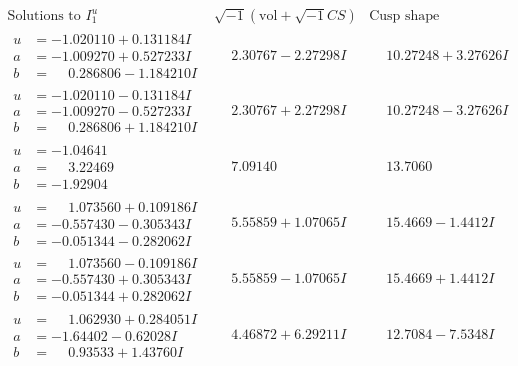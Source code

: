 \documentclass[1p]{elsarticle_modified}
\theoremstyle{definition}
\newcommand{\I}{\sqrt{-1}}
\begin{document}
$$\begin{array}{c|c|c}  
\text{Solutions to }I^u_{1}& \I (\text{vol} + \sqrt{-1}CS) & \text{Cusp shape}\\
 \hline 
\begin{aligned}
u &= -1.020110 + 0.131184 I \\
a &= -1.009270 + 0.527233 I \\
b &= \phantom{-}0.286806 - 1.184210 I\end{aligned}
 & \phantom{-}2.30767 - 2.27298 I & \phantom{-}10.27248 + 3.27626 I \\ \hline\begin{aligned}
u &= -1.020110 - 0.131184 I \\
a &= -1.009270 - 0.527233 I \\
b &= \phantom{-}0.286806 + 1.184210 I\end{aligned}
 & \phantom{-}2.30767 + 2.27298 I & \phantom{-}10.27248 - 3.27626 I \\ \hline\begin{aligned}
u &= -1.04641\phantom{ +0.000000I} \\
a &= \phantom{-}3.22469\phantom{ +0.000000I} \\
b &= -1.92904\phantom{ +0.000000I}\end{aligned}
 & \phantom{-}7.09140\phantom{ +0.000000I} & \phantom{-}13.7060\phantom{ +0.000000I} \\ \hline\begin{aligned}
u &= \phantom{-}1.073560 + 0.109186 I \\
a &= -0.557430 - 0.305343 I \\
b &= -0.051344 - 0.282062 I\end{aligned}
 & \phantom{-}5.55859 + 1.07065 I & \phantom{-}15.4669 - 1.4412 I \\ \hline\begin{aligned}
u &= \phantom{-}1.073560 - 0.109186 I \\
a &= -0.557430 + 0.305343 I \\
b &= -0.051344 + 0.282062 I\end{aligned}
 & \phantom{-}5.55859 - 1.07065 I & \phantom{-}15.4669 + 1.4412 I \\ \hline\begin{aligned}
u &= \phantom{-}1.062930 + 0.284051 I \\
a &= -1.64402 - 0.62028 I \\
b &= \phantom{-}0.93533 + 1.43760 I\end{aligned}
 & \phantom{-}4.46872 + 6.29211 I & \phantom{-}12.7084 - 7.5348 I \\ \hline\begin{aligned}

\end{aligned}
\end{array}$$
\end{document}
